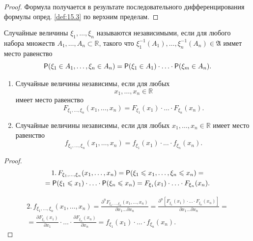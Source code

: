 \begin{proof}
	Формула получается в результате последовательного дифференцирования формулы опред. \ref{def:15.3} по верхним пределам.
\end{proof}

\begin{definition}
\label{def:15.5}
	Случайные величины $\xi_1, \dots, \xi_n$ называются независимыми, если для любого набора множеств $A_1,\dots ,A_n \subset \mathbb{R}$, такого что\newline
 	$\xi_1^{-1}(A_1), \dots, \xi_n^{-1}(A_n)\in\mathfrak{A}$ иммет место равенство
 	\begin{equation*}
 		\P(\xi_1\in A_1,\dots,\xi_n\in A_n)=\P(\xi_1 \in A_1)\cdot\ldots\cdot\P(\xi_m\in A_n).
 	\end{equation*}
\end{definition}

 \begin{lemma}
\label{lemma:15.6}

 \begin{enumerate}
 	\item Случайные величины независимы, если для любых $$x_1,\dots, x_n \in \mathbb{R}$$ имеет место равенство
 	\begin{equation*}
 		F_{\xi_1, \dots, \xi_n}(x_1,\dots,x_n)=F_{\xi_1}(x_1)\cdot\ldots\cdot F_{\xi_n}(x_n).
 	\end{equation*}
 	\item Случайные величины независимы, если для любых $x_1,\ldots,x_n\in\mathbb{R}$ имеет место равенство
 	\begin{equation*}
		f_{\xi_1, \dots, \xi_n}(x_1,\dots,x_n)=f_{\xi_1}(x_1)\cdot\ldots\cdot f_{\xi_n}(x_n). 		
 	\end{equation*}
 \end{enumerate}
\end{lemma}

\begin{proof}
	\begin{gather*}
	1. \,F_{\xi_1, \dots, \xi_n}(x_1,\dots,x_n)=\P(\xi_1\leqslant x_1,\ldots,\xi_n
	\leqslant x_n)=\\=
	\P(\xi_1\leqslant x_1)\cdot\ldots\cdot\P(\xi_n\leqslant x_n)=F_{\xi_1}(x_1)\cdot\ldots\cdot F_{\xi_n}(x_n).
	\end{gather*}	

	
	\begin{gather*}
	2. \,f_{\xi_1,\ldots,\xi_n}(x_1,\ldots,x_n)=
		\frac
		{\partial^nF_{\xi_1, \dots, \xi_n}(x_1,\dots,x_n)}
		{\partial x_1\ldots \partial x_n}=
		\frac
		{\partial^n\left[F_{\xi_1}(x_1)\cdot\ldots\cdot F_{\xi_n}(x_n)\right]}
		{\partial x_1\ldots \partial x_n}=\\=
		\frac{\partial F_{\xi_1}(x_1)}{\partial x_1}\cdot\ldots\cdot
		\frac{\partial F_{\xi_n}(x_n)}{\partial x_n}=f_{\xi_1}(x_1)\cdot\ldots\cdot f_{\xi_n}(x_n).
	\end{gather*}
\end{proof}

